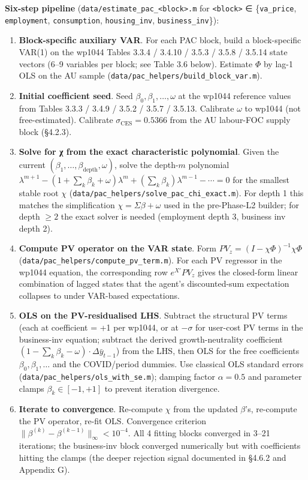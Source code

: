 \documentclass[
]{article}
\begin{document}
\textbf{Six-step pipeline}
(\texttt{data/estimate\_pac\_\textless{}block\textgreater{}.m} for
\texttt{\textless{}block\textgreater{}} ∈ \{\texttt{va\_price},
\texttt{employment}, \texttt{consumption}, \texttt{housing\_inv},
\texttt{business\_inv}\}):

\begin{enumerate}
\def\labelenumi{\arabic{enumi}.}
\item
  \textbf{Block-specific auxiliary VAR}. For each PAC block, build a
  block-specific VAR(1) on the wp1044 Tables 3.3.4 / 3.4.10 / 3.5.3 /
  3.5.8 / 3.5.14 state vectors (6--9 variables per block; see Table 3.6
  below). Estimate \(\Phi\) by lag-1 OLS on the AU sample
  (\texttt{data/pac\_helpers/build\_block\_var.m}).
\item
  \textbf{Initial coefficient seed}. Seed
  \(\beta_0, \beta_1, \ldots, \omega\) at the wp1044 reference values
  from Tables 3.3.3 / 3.4.9 / 3.5.2 / 3.5.7 / 3.5.13. Calibrate
  \(\omega\) to wp1044 (not free-estimated). Calibrate
  \(\sigma_{\mathrm{CES}} = 0.5366\) from the AU labour-FOC supply block
  (§4.2.3).
\item
  \textbf{Solve for χ from the exact characteristic polynomial}. Given
  the current \((\beta_1, \ldots, \beta_{\mathrm{depth}}, \omega)\),
  solve the depth-\(m\) polynomial
  \(\lambda^{m+1} - (1 + \sum_k \beta_k + \omega)\lambda^m + (\sum_k \beta_k)\lambda^{m-1} - \cdots = 0\)
  for the smallest stable root \(\chi\)
  (\texttt{data/pac\_helpers/solve\_pac\_chi\_exact.m}). For depth 1
  this matches the simplification \(\chi = \Sigma\beta + \omega\) used
  in the pre-Phase-L2 builder; for depth \(\geq 2\) the exact solver is
  needed (employment depth 3, business inv depth 2).
\item
  \textbf{Compute PV operator on the VAR state}. Form
  \(PV_z = (I - \chi \Phi)^{-1} \chi \Phi\)
  (\texttt{data/pac\_helpers/compute\_pv\_term.m}). For each PV
  regressor in the wp1044 equation, the corresponding row
  \(e^{X'} PV_z\) gives the closed-form linear combination of lagged
  states that the agent's discounted-sum expectation collapses to under
  VAR-based expectations.
\item
  \textbf{OLS on the PV-residualised LHS}. Subtract the structural PV
  terms (each at coefficient = +1 per wp1044, or at \(-\sigma\) for
  user-cost PV terms in the business-inv equation; subtract the derived
  growth-neutrality coefficient
  \((1 - \sum_k \beta_k - \omega) \cdot \Delta\bar{y}_{t-1}\)) from the
  LHS, then OLS for the free coefficients \(\beta_0, \beta_1, \ldots\)
  and the COVID/period dummies. Use classical OLS standard errors
  (\texttt{data/pac\_helpers/ols\_with\_se.m}); damping factor
  \(\alpha = 0.5\) and parameter clamps \(\beta_k \in [-1, +1]\) to
  prevent iteration divergence.
\item
  \textbf{Iterate to convergence}. Re-compute \(\chi\) from the updated
  \(\beta\)'s, re-compute the PV operator, re-fit OLS. Convergence
  criterion \(\|\beta^{(k)} - \beta^{(k-1)}\|_\infty < 10^{-4}\). All 4
  fitting blocks converged in 3--21 iterations; the business-inv block
  converged numerically but with coefficients hitting the clamps (the
  deeper rejection signal documented in §4.6.2 and Appendix G).
\end{enumerate}
\end{document}
